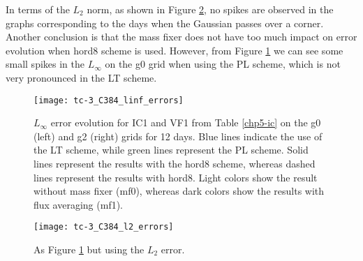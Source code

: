 \newpage
In terms of the $L_2$ norm, as shown in Figure \ref{chp-advcs-sec-exp-adv2-evol-l2}, 
no spikes are observed in the graphs corresponding to the days when the Gaussian passes over a corner.
Another conclusion is that the mass fixer does not have too much impact on error evolution when hord8 scheme is used.
However, from Figure \ref{chp-advcs-sec-exp-adv2-evol-linf} we can see some small spikes in the $L_{\infty}$
on the g0 grid when using the PL scheme, which is not very pronounced in the LT scheme.
\begin{figure}[!htb]
	\centering
	\texttt{[image: tc-3\_C384\_linf\_errors]}
	\caption{
		$L_{\infty}$ error evolution for IC1 and VF1 from Table \ref{chp5-ic} on the g0 (left) and g2 (right) grids for 12 days.
		Blue lines indicate the use of the LT scheme, while green lines represent the PL scheme.
		Solid lines represent the results with the hord8 scheme, whereas dashed lines represent the results with hord8.
		Light colors show the result without mass fixer (mf0), whereas dark colors show the results with flux averaging (mf1).
		\label{chp-advcs-sec-exp-adv2-evol-linf}}
\end{figure}

\begin{figure}[!htb]
	\centering
	\texttt{[image: tc-3\_C384\_l2\_errors]}
	\caption{As Figure \ref{chp-advcs-sec-exp-adv2-evol-linf} but using the $L_2$ error.\label{chp-advcs-sec-exp-adv2-evol-l2}}
\end{figure}

